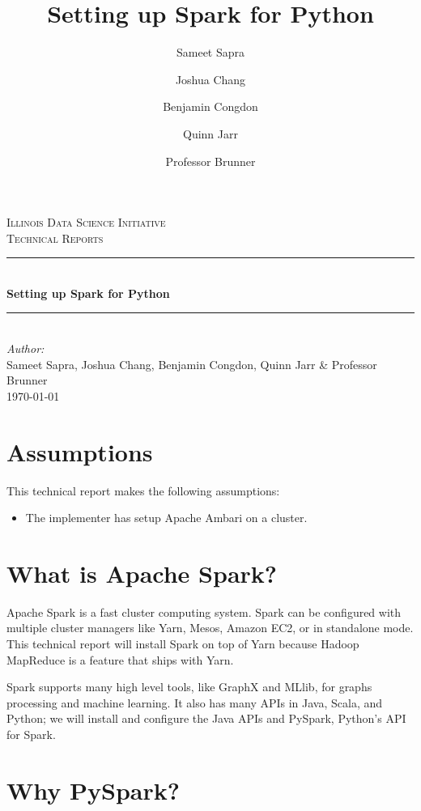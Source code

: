 \documentclass[9pt,twocolumn,twoside]{idsi}
\author[1]{Sameet Sapra}
\author[2]{Joshua Chang}
\author[3]{Benjamin Congdon}
\author[4]{Quinn Jarr}
\author[5]{Professor Brunner}
\title{Setting up Spark for Python}
\newcommand{\HRule}{\rule{\linewidth}{0.5mm}}
\begin{document}
\begin{titlepage}
\center 
\textsc{\LARGE Illinois Data Science Initiative}\\[1.5cm] 
\textsc{\Large Technical Reports}\\[0.5cm] \HRule \\[0.4cm]
{\huge \bfseries Setting up Spark for Python } \\[0.4cm] \HRule \\[1.5cm]
\Large \emph{Author:}\\ Sameet Sapra, Joshua Chang, Benjamin Congdon, Quinn Jarr \& Professor Brunner\\[3cm]
{\large \today}\\[3cm] %
\vfill
\end{titlepage}

\maketitle

\section{Assumptions}

This technical report makes the following assumptions:
\begin{itemize}
\item The implementer has setup Apache Ambari on a cluster.
\end{itemize}

\section{What is Apache Spark?}

Apache Spark is a fast cluster computing system. Spark can be configured with multiple cluster managers like Yarn, Mesos, Amazon EC2, or in standalone mode. This technical report will install Spark on top of Yarn because Hadoop MapReduce is a feature that ships with Yarn.

Spark supports many high level tools, like GraphX and MLlib, for graphs processing and machine learning. It also has many APIs in Java, Scala, and Python; we will install and configure the Java APIs and PySpark, Python's API for Spark.

\section{Why PySpark?}
\end{document}
